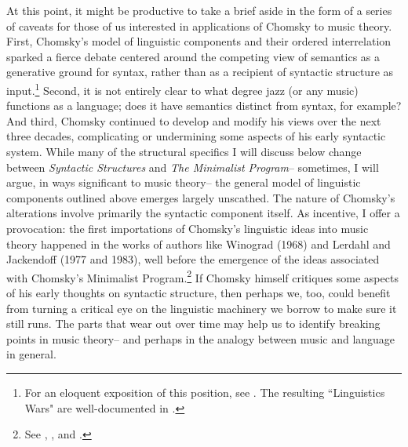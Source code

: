 At this point, it might be productive to take a brief aside in the form of a series of caveats for those of us interested in applications of Chomsky to music theory.  First, Chomsky's model of linguistic components and their ordered interrelation sparked a fierce debate centered around the competing view of semantics as a generative ground for syntax, rather than as a recipient of syntactic structure as input.\footnote{For an eloquent exposition of this position, see \cite{jackendoff1992}.  The resulting ``Linguistics Wars" are well-documented in \cite{harris1995}.}  Second, it is not entirely clear to what degree jazz (or any music) functions as a language; does it have semantics distinct from syntax, for example?  And third, Chomsky continued to develop and modify his views over the next three decades, complicating or undermining some aspects of his early syntactic system.  While many of the structural specifics I will discuss below change between \emph{Syntactic Structures} and \emph{The Minimalist Program}-- sometimes, I will argue, in ways significant to music theory-- the general model of linguistic components outlined above emerges largely unscathed.  The nature of Chomsky's alterations involve primarily the syntactic component itself.  As incentive, I offer a provocation: the first importations of Chomsky's linguistic ideas into music theory happened in the works of authors like Winograd (1968) and Lerdahl and Jackendoff (1977 and 1983), well before the emergence of the ideas associated with Chomsky's Minimalist Program.\footnote{See \cite{winograd1968}, \cite{lj1977}, and \cite{lj1983}.}  If Chomsky himself critiques some aspects of his early thoughts on syntactic structure, then perhaps we, too, could benefit from turning a critical eye on the linguistic machinery we borrow to make sure it still runs.  The parts that wear out over time may help us to identify breaking points in music theory-- and perhaps in the analogy between music and language in general.

